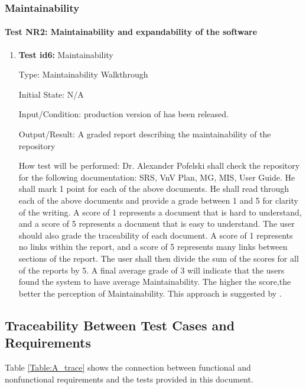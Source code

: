 \documentclass[12pt, titlepage]{article}
\begin{document}
\subsubsection{Maintainability}

\paragraph{Test NR2: Maintainability and expandability of the software}

\begin{enumerate}
	
	\item{\textbf{Test id6:} Maintainability\\}
	
	Type: Maintainability Walkthrough
	
	Initial State: N/A
	
	Input/Condition: production version of \progname{} has been released.
	
	Output/Result: A graded report describing the maintainability of the repository
	
	How test will be performed: Dr. Alexander Pofelski shall check the repository for the following documentation:  SRS, VnV Plan, MG, MIS, User Guide. He shall mark 1 point for each of the above documents. He shall read through each of the above documents and
	provide a grade between 1 and 5 for clarity of the writing. A score of 1 represents a document that is hard to understand, and a score of 5 represents a document that is easy to understand. The user should also grade the traceability of each document. A score of 1 represents no links within the report, and a score of 5 represents many links between sections of the report. The user shall then divide the sum of the scores for all of the reports by 5.
	 A final average grade of 3 will indicate that the users found the system to have average Maintainability. The higher the score,the better the perception of Maintainability. This approach is suggested by \cite{LatticeB41:online}. 
					
\end{enumerate}

\subsection{Traceability Between Test Cases and Requirements}

Table \ref{Table:A_trace} shows the connection between functional and nonfunctional requirements and the tests provided in this document. 
\end{document}
